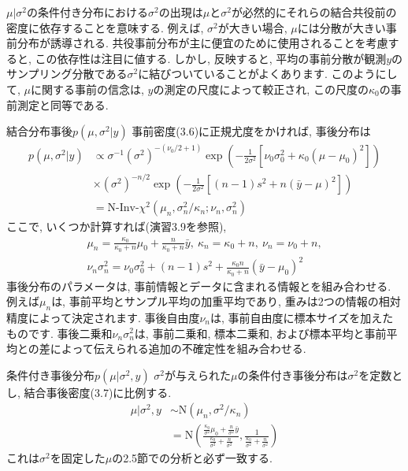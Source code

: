 \documentclass[10pt,dvipdfmx,a4]{beamer}
\newcommand{\eq}[1]{\begin{align}#1\end{align}}
\newcommand{\eqn}[1]{\begin{align*}#1\end{align*}}
\begin{document}

\begin{frame}
$\mu|\sigma^2$の条件付き分布における$\sigma^2$の出現は$\mu$と$\sigma^2$が必然的にそれらの結合共役前の密度に依存することを意味する.
例えば, $\sigma^2$が大きい場合, $\mu$には分散が大きい事前分布が誘導される.
共役事前分布が主に便宜のために使用されることを考慮すると, この依存性は注目に値する.
しかし, 反映すると, 平均の事前分散が観測$y$のサンプリング分散である$\sigma^2$に結びついていることがよくあります.
このようにして, $\mu$に関する事前の信念は, $y$の測定の尺度によって較正され, この尺度の$\kappa_0$の事前測定と同等である.
\end{frame}


\begin{frame}{結合分布事後$p(\mu,\sigma^2|y)$}
事前密度(3.6)に正規尤度をかければ, 事後分布は
\eq{p(\mu,\sigma^2|y)&\propto\sigma^{-1}(\sigma^2)^{-(\nu_0/2+1)}\exp \left( -\frac{1}{2\sigma^2}[\nu_0\sigma_0^2+\kappa_0(\mu-\mu_0)^2]\right)\nonumber\\
&\times (\sigma^2)^{-n/2}\exp \left( -\frac{1}{2\sigma^2}[(n-1)s^2+n(\bar{y}-\mu)^2]\right)\nonumber\\
&=\text{N-Inv-}\chi^2(\mu_n,\sigma^2_n/\kappa_n;\nu_n,\sigma_n^2)}
ここで, いくつか計算すれば(演習3.9を参照), 
\eqn{\mu_n=\frac{\kappa_0}{\kappa_0+n}\mu_0+\frac{n}{\kappa_0+n}\bar{y},\ \kappa_n=\kappa_0+n,\ \nu_n=\nu_0+n,\\\nu_n\sigma_n^2=\nu_0\sigma^2_0+(n-1)s^2+\frac{\kappa_0n}{\kappa_0+n}(\bar{y}-\mu_0)^2}
事後分布のパラメータは, 事前情報とデータに含まれる情報とを組み合わせる.
例えば$\mu_n$は, 事前平均とサンプル平均の加重平均であり, 重みは2つの情報の相対精度によって決定されます.
事後自由度$\nu_n$は, 事前自由度に標本サイズを加えたものです.
事後二乗和$\nu_n\sigma^2_n$は, 事前二乗和, 標本二乗和, および標本平均と事前平均との差によって伝えられる追加の不確定性を組み合わせる.
\end{frame}


\begin{frame}{条件付き事後分布$p(\mu|\sigma^2,y)$}
$\sigma^2$が与えられた$\mu$の条件付き事後分布は$\sigma^2$を定数とし, 結合事後密度(3.7)に比例する.
\eq{\mu|\sigma^2,y&\sim\text{N}(\mu_n,\sigma^2/\kappa_n)\nonumber\\
&=\text{N}\left(\frac{\tfrac{\kappa_0}{\sigma^2}\mu_0+\tfrac{n}{\sigma^2}\bar{y}}{\frac{\kappa_0}{\sigma^2}+\tfrac{n}{\sigma^2}}, \frac{1}{\frac{\kappa_0}{\sigma^2}+\tfrac{n}{\sigma^2}}\right)}
これは$\sigma^2$を固定した$\mu$の2.5節での分析と必ず一致する.
\end{frame}
\end{document}
